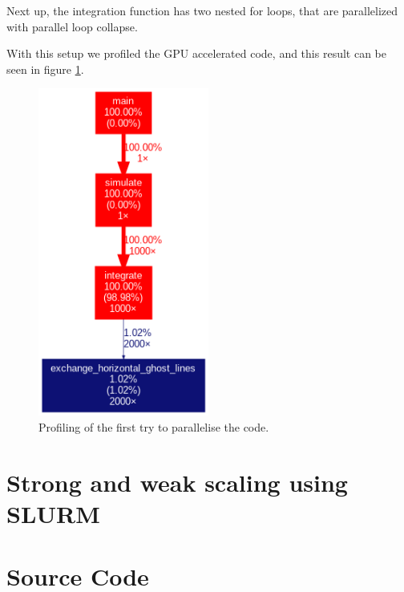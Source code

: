\documentclass{article}
\begin{document}
Next up, the integration function has two nested for loops, that are parallelized with parallel loop collapse.

With this setup we profiled the GPU accelerated code, and this result can be seen in figure \ref{fig:profiling:firstattempt}.
\begin{figure}[h]
    \includegraphics[width=0.5\textwidth]{./figures/sequential_profile.png}
    \centering
    \caption*{Profiling of the first try to parallelise the code. }
    \label{fig:profiling:firstattempt}
\end{figure}


\section{Strong and weak scaling using SLURM}



\FloatBarrier
\section{Source Code}
\label{sec:source}

\end{document}
